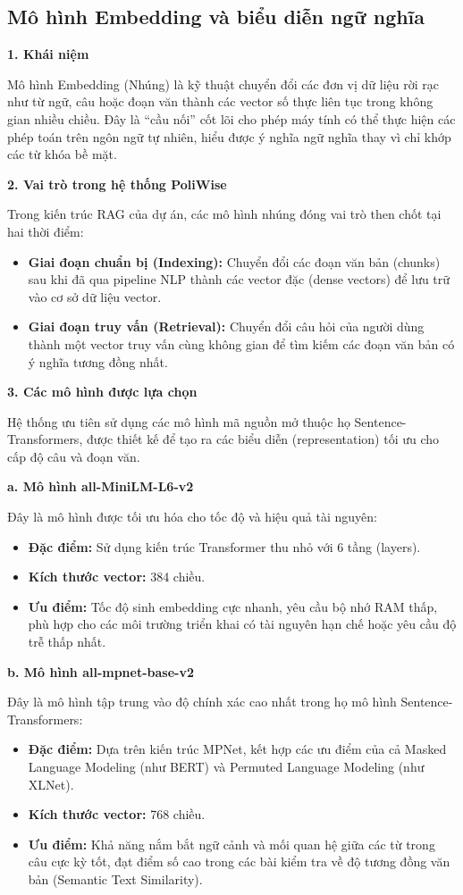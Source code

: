 \documentclass[12pt,a4paper]{report}
\begin{document}
\subsection{Mô hình Embedding và biểu diễn ngữ nghĩa}
\textbf{1. Khái niệm}

Mô hình Embedding (Nhúng) là kỹ thuật chuyển đổi các đơn vị dữ liệu rời rạc như từ ngữ, câu hoặc đoạn văn thành các vector số thực liên tục trong không gian nhiều chiều. Đây là ``cầu nối'' cốt lõi cho phép máy tính có thể thực hiện các phép toán trên ngôn ngữ tự nhiên, hiểu được ý nghĩa ngữ nghĩa thay vì chỉ khớp các từ khóa bề mặt.

\textbf{2. Vai trò trong hệ thống PoliWise}

Trong kiến trúc RAG của dự án, các mô hình nhúng đóng vai trò then chốt tại hai thời điểm:
\begin{itemize}
    \item \textbf{Giai đoạn chuẩn bị (Indexing):} Chuyển đổi các đoạn văn bản (chunks) sau khi đã qua pipeline NLP thành các vector đặc (dense vectors) để lưu trữ vào cơ sở dữ liệu vector.
    \item \textbf{Giai đoạn truy vấn (Retrieval):} Chuyển đổi câu hỏi của người dùng thành một vector truy vấn cùng không gian để tìm kiếm các đoạn văn bản có ý nghĩa tương đồng nhất.
\end{itemize}

\textbf{3. Các mô hình được lựa chọn}

Hệ thống ưu tiên sử dụng các mô hình mã nguồn mở thuộc họ Sentence-Transformers, được thiết kế để tạo ra các biểu diễn (representation) tối ưu cho cấp độ câu và đoạn văn.

\textbf{a. Mô hình all-MiniLM-L6-v2}

Đây là mô hình được tối ưu hóa cho tốc độ và hiệu quả tài nguyên:
\begin{itemize}
    \item \textbf{Đặc điểm:} Sử dụng kiến trúc Transformer thu nhỏ với 6 tầng (layers).
    \item \textbf{Kích thước vector:} 384 chiều.
    \item \textbf{Ưu điểm:} Tốc độ sinh embedding cực nhanh, yêu cầu bộ nhớ RAM thấp, phù hợp cho các môi trường triển khai có tài nguyên hạn chế hoặc yêu cầu độ trễ thấp nhất.
\end{itemize}

\textbf{b. Mô hình all-mpnet-base-v2}

Đây là mô hình tập trung vào độ chính xác cao nhất trong họ mô hình Sentence-Transformers:
\begin{itemize}
    \item \textbf{Đặc điểm:} Dựa trên kiến trúc MPNet, kết hợp các ưu điểm của cả Masked Language Modeling (như BERT) và Permuted Language Modeling (như XLNet).
    \item \textbf{Kích thước vector:} 768 chiều.
    \item \textbf{Ưu điểm:} Khả năng nắm bắt ngữ cảnh và mối quan hệ giữa các từ trong câu cực kỳ tốt, đạt điểm số cao trong các bài kiểm tra về độ tương đồng văn bản (Semantic Text Similarity).
\end{itemize}
\end{document}
